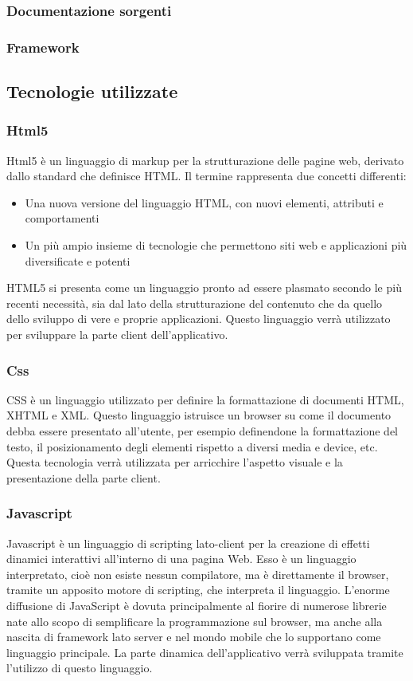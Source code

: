 \subsubsection{Documentazione sorgenti}

\subsubsection{Framework}

\subsection{Tecnologie utilizzate}
\subsubsection{Html5}
Html5 è un linguaggio di markup per la strutturazione delle pagine web, derivato dallo standard che definisce HTML.
Il termine rappresenta due concetti differenti:
\begin{itemize}
		\item
			Una nuova versione del linguaggio HTML, con nuovi elementi, attributi e comportamenti
		\item
			Un più ampio insieme di tecnologie che permettono siti web e applicazioni più diversificate e potenti
\end{itemize}
HTML5 si presenta come un linguaggio pronto ad essere plasmato secondo le più recenti necessità, sia dal lato della strutturazione del contenuto che da quello dello sviluppo di vere e proprie applicazioni.
Questo linguaggio verrà utilizzato per sviluppare la parte client dell'applicativo.

\subsubsection{Css}
CSS è un linguaggio utilizzato per definire la formattazione di documenti HTML, XHTML e XML.
Questo linguaggio istruisce un browser su come il documento debba essere presentato all'utente, per esempio definendone la formattazione del testo, il posizionamento degli elementi rispetto a diversi media e device, etc.
Questa tecnologia verrà utilizzata per arricchire l'aspetto visuale e la presentazione della parte client.
\subsubsection{Javascript}
Javascript è un linguaggio di scripting lato-client per la creazione di effetti dinamici interattivi all'interno di una pagina Web. Esso è un linguaggio interpretato, cioè non esiste nessun compilatore, ma è direttamente il browser, tramite un apposito motore di scripting, che interpreta il linguaggio.
L’enorme diffusione di JavaScript è dovuta principalmente al fiorire di numerose librerie nate allo scopo di semplificare la programmazione sul browser, ma anche alla nascita di framework lato server e nel mondo mobile che lo supportano come linguaggio principale.
La parte dinamica dell'applicativo verrà sviluppata tramite l'utilizzo di questo linguaggio.


